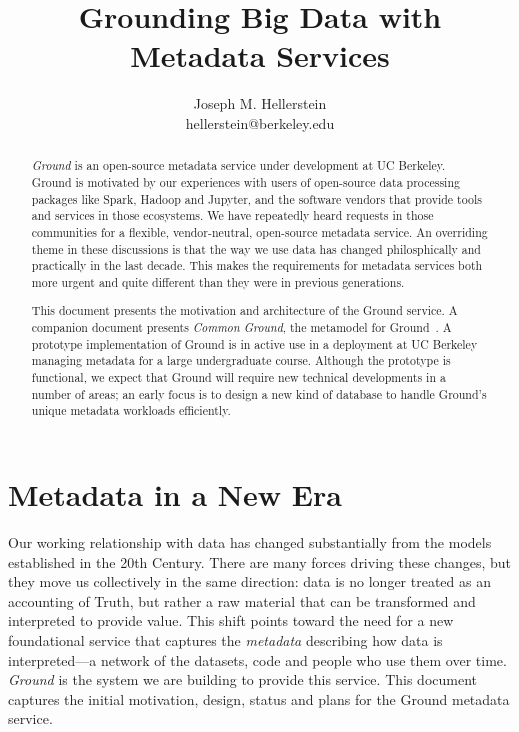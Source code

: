 \documentclass[10pt,letterpaper]{article}
\author{
Joseph M. Hellerstein\\
       {\scriptsize hellerstein@berkeley.edu}
}
\title{Grounding Big Data with Metadata Services}
\date{}
\newcommand{\jmh}[1]{{\textcolor{red}{#1---jmh}}}
\begin{document}
\maketitle

\begin{abstract}
\emph{Ground} is an open-source metadata service under development at UC Berkeley.  Ground is motivated by our experiences with users of open-source data processing packages like Spark, Hadoop and Jupyter, and the software vendors that provide tools and services in those ecosystems.  We have repeatedly heard requests in those communities for a flexible, vendor-neutral, open-source metadata service.  An overriding theme in these discussions is that the way we use data has changed philosphically and practically in the last decade.  This makes the requirements for metadata services both more urgent and quite different than they were in previous generations.

This document presents the motivation and architecture of the Ground service.  A companion document presents \emph{Common Ground}, the metamodel for Ground~\cite{commonground}.  A prototype implementation of Ground is in active use in a deployment at UC Berkeley managing metadata for a large undergraduate course.  Although the prototype is functional, we expect that Ground will require new technical developments in a number of areas; an early focus is to design a new kind of database to handle Ground's unique metadata workloads efficiently.
\end{abstract}


\section{Metadata in a New Era}
\label{sec:intro}
Our working relationship with data has changed substantially from the models established in the 20th Century.  There are many forces driving these changes, but they move us collectively in the same direction: data is no longer treated as an accounting of Truth, but rather a raw material that can be transformed and interpreted to provide value.  
This shift points toward the need for a new foundational service that captures the \emph{metadata} describing how data is interpreted---a network of the datasets, code and people who use them over time.  \emph{Ground} is the system we are building to provide this service.  This document captures the initial motivation, design, status and plans for the Ground metadata service.
\end{document}
